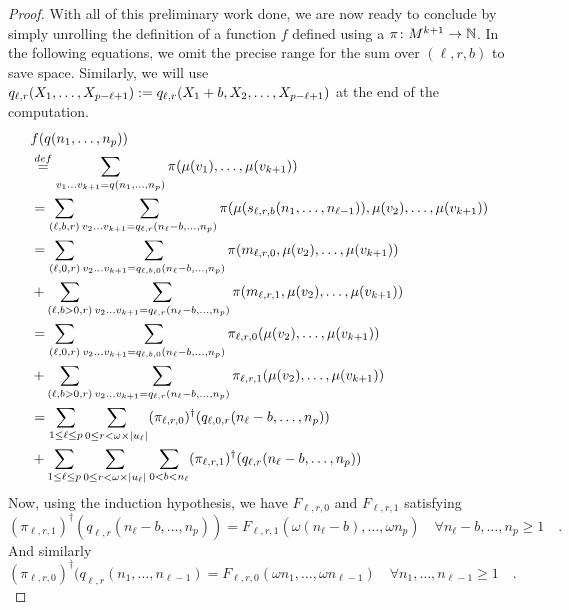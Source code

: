 \begin{proof}
    With all of this preliminary work done, we are now ready to conclude by
    simply unrolling the definition of 
    a function
    $f$ defined using a 
    $\pi \colon M^{k+1} \to \mathbb{N}$.
    In the following equations, we omit the precise
    range for the sum over $(\ell, r, b)$ to save space.
    Similarly, we will use 
    $q_{\ell,r}(X_1, \dots, X_{p-\ell+1})
    \mathrel{:=} q_{\ell,r}(X_1+b, X_2, \dots, X_{p - \ell + 1})$
    at the end of the computation.
    \begin{align*}
        &f(q(n_1, \dots, n_p))\\
        &\eqdef 
        \sum_{v_1 \dots v_{k+1} = q(n_1, \dots, n_p)}
        \pi(\mu(v_1), \dots, \mu(v_{k+1})) \\
        &= \sum_{(\ell, b, r)}
           \sum_{v_2 \dots v_{k+1} = q_{\ell,r}(n_\ell - b, \dots, n_p)}
           \pi(\mu(s_{\ell,r,b}(n_1, \dots, n_{\ell-1})), \mu(v_2), \dots, \mu(v_{k+1}))
        \\
        &= 
           \sum_{(\ell, 0, r)}
           \sum_{v_2 \dots v_{k+1} = q_{\ell,b,0}(n_\ell - b, \dots, n_p)}
           \pi(m_{\ell,r,0}, \mu(v_2), \dots, \mu(v_{k+1}))
           \\
        &+ 
           \sum_{(\ell, b > 0, r)}
           \sum_{v_2 \dots v_{k+1} = q_{\ell,r}(n_\ell - b, \dots, n_p)}
           \pi(m_{\ell,r,1}, \mu(v_2), \dots, \mu(v_{k+1}))
        \\
        &= 
           \sum_{(\ell, 0, r)}
           \sum_{v_2 \dots v_{k+1} = q_{\ell,b,0}(n_\ell - b, \dots, n_p)}
           \pi_{\ell,r,0}(\mu(v_2), \dots, \mu(v_{k+1}))
           \\
        &+ 
           \sum_{(\ell, b > 0, r)}
           \sum_{v_2 \dots v_{k+1} = q_{\ell,r}(n_\ell-b, \dots, n_p)}
           \pi_{\ell,r,1}(\mu(v_2), \dots, \mu(v_{k+1}))
        \\
        &= 
           \sum_{1 \leq \ell \leq p}
           \sum_{0 \leq r < \omega \times \card{u_\ell}}
           (\pi_{\ell,r,0})^\dagger (q_{\ell, 0, r}(n_\ell-b, \dots, n_p))
           \\
        &+ 
           \sum_{1 \leq \ell \leq p}
           \sum_{0 \leq r < \omega \times \card{u_\ell}}
           \sum_{0 < b < n_\ell}
           (\pi_{\ell,r,1})^{\dagger}(q_{\ell,r}(n_\ell - b, \dots, n_p))
    \end{align*}
    Now, using the induction hypothesis,
    we have  $F_{\ell,r,0}$ and $F_{\ell,r,1}$
    satisfying 
    \begin{equation*}
       (\pi_{\ell,r,1})^{\dagger}(q_{\ell,r}(n_\ell - b, \dots, n_p))
       = F_{\ell,r,1}(\omega (n_\ell - b), \dots, \omega n_p)
       \quad 
       \forall n_\ell - b, \dots, n_p \geq 1
       \quad .
   \end{equation*}
   And similarly
    \begin{equation*}
        (\pi_{\ell,r,0})^{\dagger}(q_{\ell,r}(n_1, \dots, n_{\ell-1})
        = F_{\ell,r,0}(\omega n_1, \dots, \omega n_{\ell-1})
       \quad 
       \forall n_1, \dots, n_{\ell - 1} \geq 1
       \quad .
   \end{equation*}


\end{proof}
